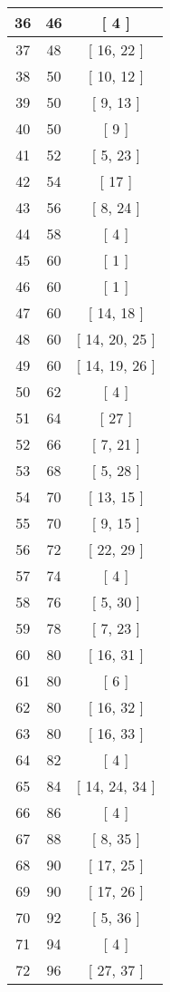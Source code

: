 \begin{center}
\begin{longtable}[H]{|| c c c ||}
\hline
36 & 46 & [ 4 ] \\ 
\hline
37 & 48 & [ 16, 22 ] \\ 
\hline
38 & 50 & [ 10, 12 ] \\ 
\hline
39 & 50 & [ 9, 13 ] \\ 
\hline
40 & 50 & [ 9 ] \\ 
\hline
41 & 52 & [ 5, 23 ] \\ 
\hline
42 & 54 & [ 17 ] \\ 
\hline
43 & 56 & [ 8, 24 ] \\ 
\hline
44 & 58 & [ 4 ] \\ 
\hline
45 & 60 & [ 1 ] \\ 
\hline
46 & 60 & [ 1 ] \\ 
\hline
47 & 60 & [ 14, 18 ] \\ 
\hline
48 & 60 & [ 14, 20, 25 ] \\ 
\hline
49 & 60 & [ 14, 19, 26 ] \\ 
\hline
50 & 62 & [ 4 ] \\ 
\hline
51 & 64 & [ 27 ] \\ 
\hline
52 & 66 & [ 7, 21 ] \\ 
\hline
53 & 68 & [ 5, 28 ] \\ 
\hline
54 & 70 & [ 13, 15 ] \\ 
\hline
55 & 70 & [ 9, 15 ] \\ 
\hline
56 & 72 & [ 22, 29 ] \\ 
\hline
57 & 74 & [ 4 ] \\ 
\hline
58 & 76 & [ 5, 30 ] \\ 
\hline
59 & 78 & [ 7, 23 ] \\ 
\hline
60 & 80 & [ 16, 31 ] \\ 
\hline
61 & 80 & [ 6 ] \\ 
\hline
62 & 80 & [ 16, 32 ] \\ 
\hline
63 & 80 & [ 16, 33 ] \\ 
\hline
64 & 82 & [ 4 ] \\ 
\hline
65 & 84 & [ 14, 24, 34 ] \\ 
\hline
66 & 86 & [ 4 ] \\ 
\hline
67 & 88 & [ 8, 35 ] \\ 
\hline
68 & 90 & [ 17, 25 ] \\ 
\hline
69 & 90 & [ 17, 26 ] \\ 
\hline
70 & 92 & [ 5, 36 ] \\ 
\hline
71 & 94 & [ 4 ] \\ 
\hline
72 & 96 & [ 27, 37 ] \\ 

\end{longtable}
\end{center}
